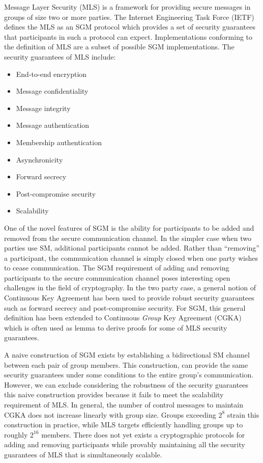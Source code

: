 \documentclass[12pt,twocolumn]{article}
\begin{document}
	Message Layer Security (MLS) \cite{Omara2020} is a framework for providing secure messages in groups of size two or more parties.
	The Internet Engineering Task Force (IETF) defines the MLS as an SGM protocol which provides a set of security guarantees that participants in such a protocol can expect.
	Implementations conforming to the definition of MLS are a subset of possible SGM implementations.
	The security guarantees of MLS include:
	
	\begin{itemize}
		\item End-to-end encryption \cite{padlipsky1978limitations}
		\item Message confidentiality
		\item Message integrity \cite{voydock1983security}
		\item Message authentication \cite{jueneman1983message}
		\item Membership authentication \cite{chaum1985showing}
		\item Asynchronicity
		\item Forward secrecy \cite{gunther1989identity}
		\item Post-compromise security \cite{cohn2016post}
		\item Scalability
	\end{itemize}
	
	One of the novel features of SGM is the ability for participants to be added and removed from the secure communication channel.
	In the simpler case when two parties use SM, additional participants cannot be added. Rather than ``removing'' a participant, the communication channel is simply closed when one party wishes to cease communication.
	The SGM requirement of adding and removing participants to the secure communication channel poses interesting open challenges in the field of cryptography.
	In the two party case, a general notion of Continuous Key Agreement has been used to provide robust security guarantees such as forward secrecy and post-compromise security.
	For SGM, this general definition has been extended to Continuous \emph{Group} Key Agreement (CGKA) which is often used as lemma to derive proofs for some of MLS security guarantees.
	
	A naive construction of SGM exists by establishing a bidirectional SM channel between each pair of group members.
	This construction, can provide the same security guarantees under some conditions to the entire group's communication.
	However, we can exclude considering the robustness of the security guarantees this naive construction provides because it fails to meet the scalability requirement of MLS.
	In general, the number of control messages to maintain CGKA does not increase linearly with group size.
	Groups exceeding $2^8$ strain this construction in practice, while MLS targets efficiently handling groups up to roughly $2^{16}$ members.
	There does not yet exists a cryptographic protocols for adding and removing participants while provably maintaining all the security guarantees of MLS that is simultaneously scalable.
	
\end{document}
